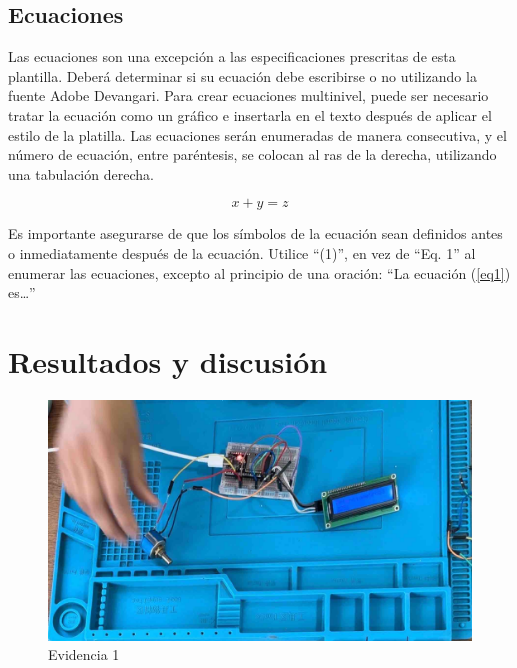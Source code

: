    \subsection{Ecuaciones}
    
    Las ecuaciones son una excepción a las especificaciones prescritas de esta plantilla. 
    Deberá determinar si su ecuación debe escribirse o no utilizando la fuente Adobe Devangari. 
    Para crear ecuaciones multinivel, puede ser necesario tratar la ecuación como un gráfico e insertarla en el texto después de aplicar el estilo de la platilla.
    Las ecuaciones serán enumeradas de manera consecutiva, y el número de ecuación, entre paréntesis, se colocan al ras de la derecha, utilizando una tabulación derecha. 
    
    \begin{equation}
        \label{eq1}
        x + y = z 
    \end{equation}
    
    Es importante asegurarse de que los símbolos de la ecuación sean definidos antes o inmediatamente después de la ecuación. Utilice “(1)”, en vez de “Eq. 1” al enumerar las ecuaciones, excepto al principio de una oración: “La ecuación (\ref{eq1}) es…”
    
    \section{Resultados y discusión}
    
    \begin{figure}[H]
        \centering
        \includegraphics[trim = {0mm 0mm 0mm 0mm},clip,scale=0.2]{8/Img/Evidencia 1.pdf}
        \caption{Evidencia 1}
        \label{Evidencia 1}
    \end{figure}
    
